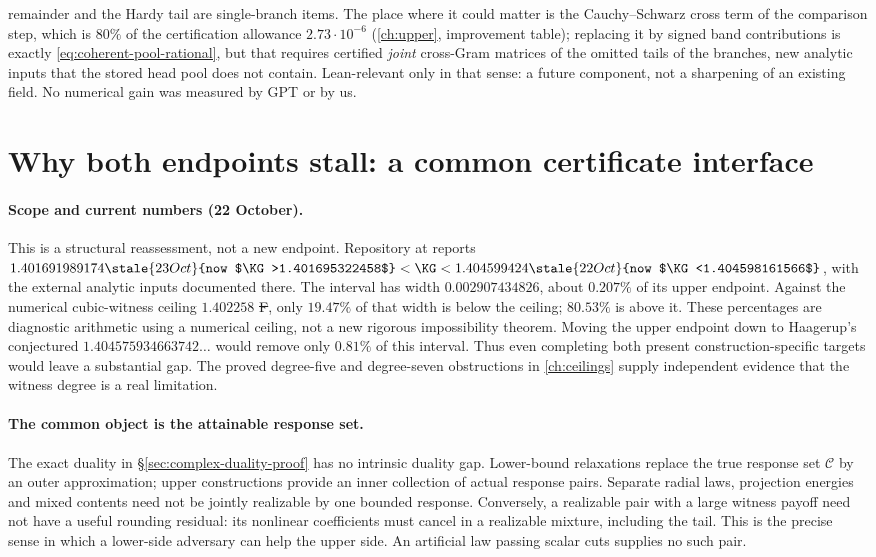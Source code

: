 remainder and the Hardy tail are single-branch items. The place where it could matter is the Cauchy--Schwarz cross term of the comparison step, which is $80\%$ of the certification
allowance $2.73\cdot10^{-6}$ (\autoref{ch:upper}, improvement table); replacing it by signed band contributions is exactly \eqref{eq:coherent-pool-rational}, but that requires certified
\emph{joint} cross-Gram matrices of the omitted tails of the branches, new analytic inputs that the stored head pool does not contain. Lean-relevant only in that sense: a future
component, not a sharpening of an existing  field. No numerical gain was measured by GPT or by us.

\section{Why both endpoints stall: a common certificate interface}
\label{sec:forest-reassessment-20261022}
\paragraph{Scope and current numbers (22 October).}
This is a structural reassessment, not a new endpoint. Repository
 at  reports
$1.401691989174\stale{23 Oct}{now $\KG>1.401695322458$}<\KG<1.404599424\stale{22 Oct}{now $\KG<1.404598161566$}$, with the external analytic inputs
documented there. The interval has width $0.002907434826$, about
$0.207\%$ of its upper endpoint. Against the numerical cubic-witness
ceiling $1.402258$ \st{F}, only $19.47\%$ of that width is below the
ceiling; $80.53\%$ is above it. These percentages are diagnostic arithmetic
using a numerical ceiling, not a new rigorous impossibility theorem.
Moving the upper endpoint down to Haagerup's conjectured
$1.404575934663742\ldots$ would remove only $0.81\%$ of this interval.
Thus even completing both present construction-specific targets would
leave a substantial gap. The proved degree-five and degree-seven
obstructions in \autoref{ch:ceilings} supply independent evidence that
the witness degree is a real limitation.

\paragraph{The common object is the attainable response set.}
The exact duality in \S\ref{sec:complex-duality-proof} has no intrinsic
duality gap. Lower-bound relaxations replace the true response set
$\mathcal C$ by an outer approximation; upper constructions provide
an inner collection of actual response pairs. Separate radial laws,
projection energies and mixed contents need not be jointly realizable
by one bounded response. Conversely, a realizable pair with a large
witness payoff need not have a useful rounding residual: its nonlinear
coefficients must cancel in a realizable mixture, including the tail.
This is the precise sense in which a lower-side adversary can help the
upper side. An artificial law passing scalar cuts supplies no such pair.


